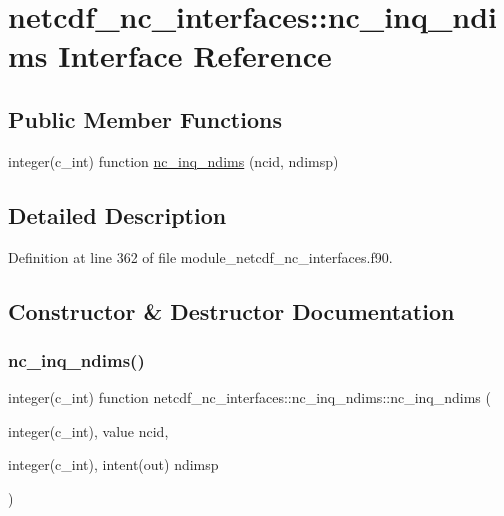 \hypertarget{interfacenetcdf__nc__interfaces_1_1nc__inq__ndims}{}\section{netcdf\+\_\+nc\+\_\+interfaces\+:\+:nc\+\_\+inq\+\_\+ndims Interface Reference}
\label{interfacenetcdf__nc__interfaces_1_1nc__inq__ndims}
\subsection*{Public Member Functions}
\begin{DoxyCompactItemize}
\item 
integer(c\+\_\+int) function \hyperlink{interfacenetcdf__nc__interfaces_1_1nc__inq__ndims_ac50992b42edde0337220b7a226b4eb8f}{nc\+\_\+inq\+\_\+ndims} (ncid, ndimsp)
\end{DoxyCompactItemize}


\subsection{Detailed Description}


Definition at line 362 of file module\+\_\+netcdf\+\_\+nc\+\_\+interfaces.\+f90.



\subsection{Constructor \& Destructor Documentation}
\mbox{\label{interfacenetcdf__nc__interfaces_1_1nc__inq__ndims_ac50992b42edde0337220b7a226b4eb8f}} 
\subsubsection{\texorpdfstring{nc\+\_\+inq\+\_\+ndims()}{nc\_inq\_ndims()}}
{\footnotesize\ttfamily integer(c\+\_\+int) function netcdf\+\_\+nc\+\_\+interfaces\+::nc\+\_\+inq\+\_\+ndims\+::nc\+\_\+inq\+\_\+ndims (\begin{DoxyParamCaption}\item[{integer(c\+\_\+int), value}]{ncid,  }\item[{integer(c\+\_\+int), intent(out)}]{ndimsp }\end{DoxyParamCaption})}




